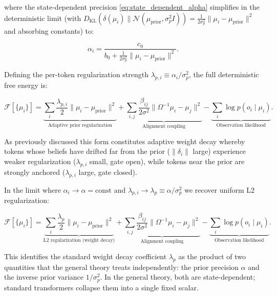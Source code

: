 \documentclass[twoside,11pt]{article}
\begin{document}
where the state-dependent precision \eqref{eq:state_dependent_alpha} simplifies in the deterministic limit (with $D_{\mathrm{KL}}(\delta(\mu_i) \| \mathcal{N}(\mu_{\text{prior}}, \sigma_p^2 I)) = \frac{1}{2\sigma_p^2}\|\mu_i - \mu_{\text{prior}}\|^2$ and absorbing constants) to:

\begin{equation}
\alpha_i = \frac{c_0}{\displaystyle b_0 + \frac{1}{2\sigma_p^2}\|\mu_i - \mu_{\text{prior}}\|^2}.
\label{eq:alpha_i_deterministic}
\end{equation}

Defining the per-token regularization strength $\lambda_{p,i} \equiv \alpha_i / \sigma_p^2$, the full deterministic free energy is:

\begin{equation}
\mathcal{F}[\{\mu_i\}] = \underbrace{\sum_i \frac{\lambda_{p,i}}{2}\|\mu_i - \mu_{\text{prior}}\|^2}_{\text{Adaptive prior regularization}} + \underbrace{\sum_{i,j} \frac{\beta_{ij}}{2\sigma^2}\|\Omega^{-1}\mu_i - \mu_j\|^2}_{\text{Alignment coupling}} - \underbrace{\sum_i \log p(o_i \mid \mu_i)}_{\text{Observation likelihood}}.
\label{eq:deterministic_free_energy_adaptive}
\end{equation}

As previously discussed this form constitutes adaptive weight decay whereby tokens whose beliefs have drifted far from the prior ($\|\delta_i\|$ large) experience weaker regularization ($\lambda_{p,i}$ small, gate open), while tokens near the prior are strongly anchored ($\lambda_{p,i}$ large, gate closed).

In the limit where $\alpha_i \to \alpha = \text{const}$ and $\lambda_{p,i} \to \lambda_p \equiv \alpha / \sigma_p^2$ we recover uniform L2 regularization:

\begin{equation}
\mathcal{F}[\{\mu_i\}] = \underbrace{\sum_i \frac{\lambda_p}{2}\|\mu_i - \mu_{\text{prior}}\|^2}_{\text{L2 regularization (weight decay)}} + \underbrace{\sum_{i,j} \frac{\beta_{ij}}{2\sigma^2}\|\Omega^{-1}\mu_i - \mu_j\|^2}_{\text{Alignment coupling}} - \underbrace{\sum_i \log p(o_i \mid \mu_i)}_{\text{Observation likelihood}}.
\label{eq:deterministic_free_energy_standard}
\end{equation}

This identifies the standard weight decay coefficient $\lambda_p$ as the product of two quantities that the general theory treats independently: the prior precision $\alpha$ and the inverse prior variance $1/\sigma_p^2$. In the general theory, both are state-dependent; standard transformers collapse them into a single fixed scalar.
\end{document}
